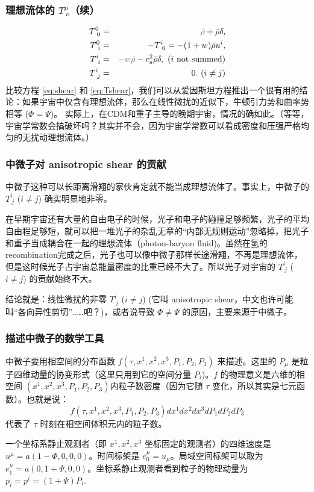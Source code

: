 \documentclass[CJK,13pt]{beamer}
\begin{document}
  \begin{frame}
    \frametitle{理想流体的  $T^\mu_{\ \nu}$（续）}
    \begin{eqnarray}
      T^0_{\ 0} &=& {\gray \bar{\rho}} + \bar{\rho}\delta, \\
      T^0_{\ i} &=& - T^i_{\ 0} = -(1+w)\bar{\rho}u^i,  \\
      T^i_{\ i} &=&  {\gray -w\bar{\rho}} - c_s^2\bar{\rho}\delta  ,\ \text{($i$ not summed)} \\
      T^i_{\ j} &=& 0.\ (i\ne j) \label{eq:Tshear}
    \end{eqnarray}
    比较方程 \eqref{eq:shear} 和 \eqref{eq:Tshear}，我们可以从爱因斯坦方程推出一个很有用的结论：{\blue 如果宇宙中仅含有理想流体，那么在线性微扰的近似下，牛顿引力势和曲率势相等 ($\Phi = \Psi$)。} 实际上，在CDM和重子主导的晚期宇宙，情况的确如此。（等等，宇宙学常数会搞破坏吗？其实并不会，因为宇宙学常数可以看成密度和压强严格均匀的无扰动理想流体。）
  \end{frame}


  \begin{frame}
    \frametitle{中微子对 anisotropic shear 的贡献}
    中微子这种可以长距离滑翔的家伙肯定就不能当成理想流体了。事实上，中微子的 $T^i_{\ j}$ ($i\ne j$) 确实明显地非零。

    \skipline

    
    在早期宇宙还有大量的自由电子的时候，光子和电子的碰撞足够频繁，光子的平均自由程足够短，就可以把一堆光子的杂乱无章的“内部无规则运动”忽略掉，把光子和重子当成耦合在一起的理想流体（photon-baryon fluid)。虽然在氢的recombination完成之后，光子也可以像中微子那样长途滑翔，不再是理想流体，但是这时候光子占宇宙总能量密度的比重已经不大了。所以光子对宇宙的 $T^i_{\ j}$ ($i\ne j$) 的贡献始终不大。

      \skipline

      结论就是：{\blue 线性微扰的非零  $T^i_{\ j}$ ($i\ne j$) (它叫 anisotropic shear，中文也许可能叫“各向异性剪切”……吧？)，或者说导致 $\Phi\ne\Psi$ 的原因，主要来源于中微子。}
  \end{frame}


  \begin{frame}
    \frametitle{描述中微子的数学工具}
    中微子要用相空间的分布函数 $f(\tau, x^1, x^2, x^3, P_1, P_2, P_3)$ 来描述。这里的 $P_\mu$ 是粒子四维动量的协变形式（这里只用到它的空间分量 $P_i$)。$f$ 的物理意义是六维的相空间 $(x^1,x^2,x^3, P_1, P_2, P_3)$内粒子数密度（因为它随 $\tau$ 变化，所以其实是七元函数）。也就是说：
      $$ f(\tau, x^1, x^2, x^3, P_1, P_2, P_3) dx^1dx^2dx^3dP_1dP_2dP_3$$
      代表了 $\tau$ 时刻在相空间体积元内的粒子数。

      \skipline

      一个坐标系静止观测者（即 $x^1, x^2, x^3$ 坐标固定的观测者）的四维速度是 $u^\mu = a(1-\Phi, 0, 0, 0)$。时间标架是 $e^\mu_0 = u_\mu$。局域空间标架可以取为 $e^{\mu}_1 = a(0, 1+\Psi, 0, 0) $。坐标系静止观测者看到粒子的物理动量为 $p_i = p^i = (1+\Psi)P_i$. 
  \end{frame}
\end{document}
